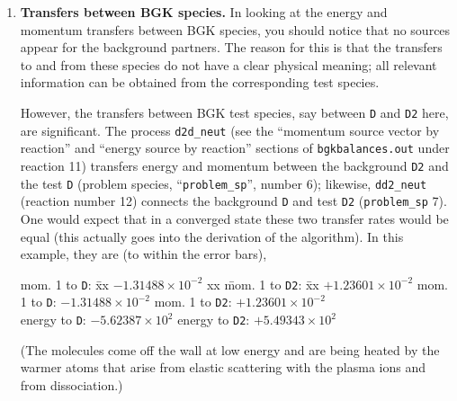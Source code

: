 \documentclass[12pt]{report}
\begin{document}
\begin{enumerate}
There will usually be a small remainder in these balances; 
its magnitude in this case roughly coincides with the accuracy provided by
{\tt outputbrowser}. This remainder results from the enforcement of a minimum
weight via Russian roulette in subroutine {\tt follow}. By default, that 
minimum weight is $10^{-3}$ of the initial weight. 
Consequently, particles, 
momentum, and energy are conserved 
only on the average (i.e., after many flights).
You can demonstrate this effect by reducing the minimum weight (\verb+WMIN+ in 
{\tt flight.web}) to, say, $10^{-7}$. 
Doing so will make the run substantially longer.
To see the difference in the conservation checks, you may
need to examine the output netCDF file directly (hint: run {\tt outputbrowser}
first to get ``rough'' values for these quantities and then use the 
search facility in Emacs to locate the corresponding data in the output
netCDF file).

  \item {\bf Transfers between BGK species.} In looking at the energy and 
momentum
transfers between BGK species, you should notice that no sources 
appear for the background partners. The reason for this is that the transfers
to and from these species do not have a clear physical meaning; all 
relevant information can be obtained from the corresponding test species.

However, the transfers between BGK test species, say between \verb+D+ and 
\verb+D2+
here, are significant. The process \verb+d2d_neut+ (see the ``momentum
source vector by reaction'' and ``energy source by reaction'' sections
of {\tt bgkbalances.out} under reaction 11) transfers
energy and momentum between the background \verb+D2+ and the test \verb+D+
(problem species, ``\verb+problem_sp+'', number 6); likewise, 
\verb+dd2_neut+ (reaction number 12) connects the
background \verb+D+ and test \verb+D2+ (\verb+problem_sp+ 7). 
One would expect that in a
converged state these two transfer rates would be equal (this actually
goes into the derivation of the algorithm). In this example, they are
(to within the error bars),
\begin{tabbing}
  mom. 1 to \verb+D+: \= xx $-1.31488 \times 10^{-2}$ xx \=  
mom. 1 to \verb+D2+: \= xx $+1.23601 \times 10^{-2}$ \kill
  mom. 1 to \verb+D+: \> $-1.31488 \times 10^{-2}$ \>  
mom. 1 to \verb+D2+: \> $+1.23601 \times 10^{-2}$ \\
  energy to \verb+D+: \> $-5.62387 \times 10^{2}$ \>
   energy to \verb+D2+: \> $+5.49343 \times 10^{2}$ \\
\end{tabbing}
(The molecules come off the wall at low energy and are being heated by the
warmer atoms that arise from elastic scattering with the plasma ions and
from dissociation.)


\end{enumerate}
\end{document}
